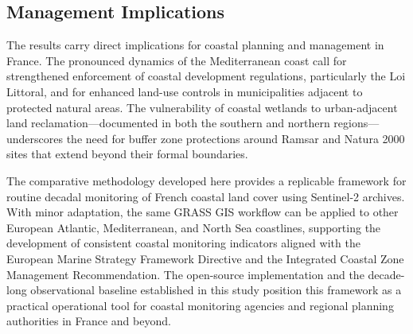 \documentclass[remotesensing,article,submit,pdftex,moreauthors]{Definitions/mdpi}
\begin{document}
\subsection{Management Implications}

The results carry direct implications for coastal planning and management in France. The pronounced dynamics of the Mediterranean coast call for strengthened enforcement of coastal development regulations, particularly the Loi Littoral, and for enhanced land-use controls in municipalities adjacent to protected natural areas. The vulnerability of coastal wetlands to urban-adjacent land reclamation—documented in both the southern and northern regions—underscores the need for buffer zone protections around Ramsar and Natura 2000 sites that extend beyond their formal boundaries.

The comparative methodology developed here provides a replicable framework for routine decadal monitoring of French coastal land cover using Sentinel-2 archives. With minor adaptation, the same GRASS GIS workflow can be applied to other European Atlantic, Mediterranean, and North Sea coastlines, supporting the development of consistent coastal monitoring indicators aligned with the European Marine Strategy Framework Directive and the Integrated Coastal Zone Management Recommendation. The open-source implementation and the decade-long observational baseline established in this study position this framework as a practical operational tool for coastal monitoring agencies and regional planning authorities in France and beyond.







\end{document}
